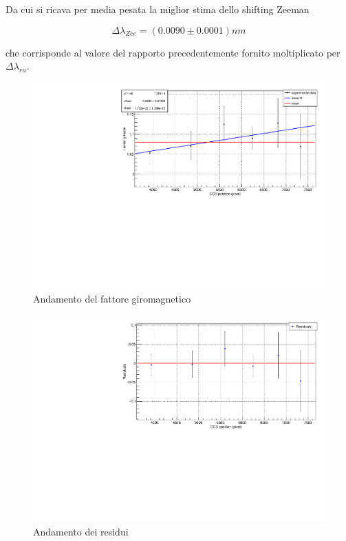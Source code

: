 \documentclass{article}
\begin{document}
	Da cui si ricava per media pesata la miglior stima dello shifting Zeeman

	\[
		\Delta\lambda_{Zee} = (0.0090 \pm 0.0001) nm	
	\]

	che corrisponde al valore del rapporto precedentemente fornito moltiplicato per $\Delta\lambda_{ru}$.

	\begin{center}
		\begin{figure}[H]
			\centering
			\includegraphics[scale=0.38, angle=0]{campomin/g.pdf}
			\caption{Andamento del fattore giromagnetico}
			\label{fig:g_min}
		\end{figure}
	\end{center}

	\begin{center}
		\begin{figure}[H]
			\centering
			\includegraphics[scale=0.38, angle=0]{campomin/g_residuals.pdf}
			\caption{Andamento dei residui}
			\label{fig:g_res_min}
		\end{figure}
	\end{center}
\end{document}
